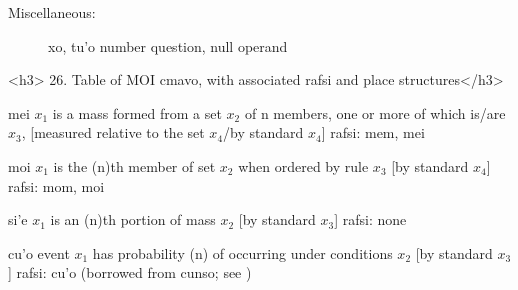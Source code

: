 Miscellaneous:
\begin{description}
\item[] xo, tu'o number question, null operand

\end{description}

<h3>
26. Table of MOI cmavo, with associated rafsi and place
    structures</h3>

   mei $x_1$ is a mass formed from a set $x_2$
        of n members, one or more of which is/are $x_3$,
        [measured relative to the set $x_4$/by standard $x_4$]
    rafsi: mem, mei

moi $x_1$ is the (n)th member of set $x_2$
        when ordered by rule $x_3$ [by standard $x_4$]
    rafsi: mom, moi

si'e    $x_1$ is an (n)th portion of mass $x_2$
        [by standard $x_3$]
    rafsi: none

cu'o    event $x_1$ has probability (n) of occurring
        under conditions $x_2$ [by standard $x_3$]
    rafsi: cu'o (borrowed from cunso; see )
